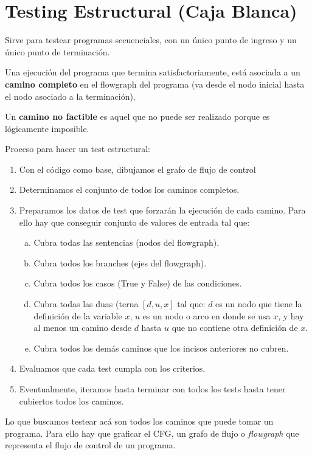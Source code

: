 \section{Testing Estructural (Caja Blanca)}

Sirve para testear programas secuenciales, con un \'unico punto de ingreso y un \'unico punto de terminaci\'on.

Una ejecuci\'on del programa que termina satisfactoriamente, est\'a asociada a un \textbf{camino completo} en el flowgraph del programa (va desde el nodo inicial hasta el nodo asociado a la terminaci\'on). 

Un \textbf{camino no factible} es aquel que no puede ser realizado porque es l\'ogicamente imposible. 

Proceso para hacer un test estructural: 

\begin{enumerate}
 \item Con el c\'odigo como base, dibujamos el grafo de flujo de control 
 \item Determinamos el conjunto de todos los caminos completos.
 \item Preparamos los datos de test que forzar\'an la ejecuci\'on de cada camino. Para ello hay que conseguir conjunto de valores de entrada tal que: 
  \begin{enumerate}[(a)]
    \item Cubra todas las sentencias (nodos del flowgraph).
    \item Cubra todos los branches (ejes del flowgraph). 
    \item Cubra todos los casos (True y False) de las condiciones.  
    \item Cubra todas las duas (terna $[d,u,x]$ tal que: $d$ es un nodo que tiene la definici\'on de la variable $x$, $u$ es un nodo o arco en donde se usa $x$, y hay al menos un camino desde $d$ hasta $u$ que no contiene otra definici\'on de $x$. 
    \item Cubra todos los dem\'as caminos que los incisos anteriores no cubren.
  \end{enumerate}
 \item Evaluamos que cada test cumpla con los criterios. 
 \item Eventualmente, iteramos hasta terminar con todos los tests hasta tener cubiertos todos los caminos. 
\end{enumerate}

Lo que buscamos testear ac\'a son todos los caminos que puede tomar un programa. Para ello hay que graficar el CFG, un grafo de flujo o \emph{flowgraph} que representa el flujo de control de un programa. 

